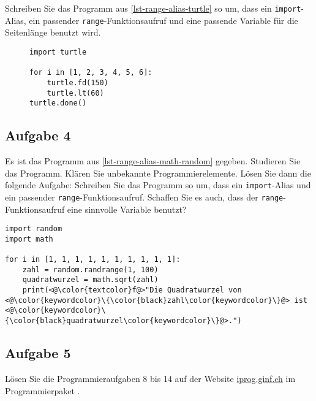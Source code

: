 Schreiben Sie das Programm aus \autoref{lst-range-alias-turtle} so um, dass ein \lstinline{import}-Alias, ein passender \lstinline{range}-Funktionsaufruf und eine passende Variable für die Seitenlänge benutzt wird.

\begin{figure}[htb]
\begin{minipage}{0.45\textwidth}
\fillwithgrid{2in}
\end{minipage}
\hfill
\begin{minipage}{0.5\textwidth}
\begin{lstlisting}[caption={Es wird ein regelmässiges \num{6}-Eck mit der Seitenlänge 150 gezeichnet.}, label={lst-range-alias-turtle}]
import turtle

for i in [1, 2, 3, 4, 5, 6]:
    turtle.fd(150)
    turtle.lt(60)
turtle.done()
\end{lstlisting}
\end{minipage}
\end{figure}

\subsection{Aufgabe 4}

Es ist das Programm aus \autoref{lst-range-alias-math-random} gegeben. Studieren Sie das Programm. Klären Sie unbekannte Programmierelemente. Lösen Sie dann die folgende Aufgabe: Schreiben Sie das Programm so um, dass ein \lstinline{import}-Alias und ein passender \lstinline{range}-Funktionsaufruf. Schaffen Sie es auch, dass der \lstinline{range}-Funktionsaufruf eine sinnvolle Variable benutzt?

\begin{lstlisting}[caption={Es werden Quadratwurzeln berechnet.}, label={lst-range-alias-math-random}]
import random
import math

for i in [1, 1, 1, 1, 1, 1, 1, 1, 1, 1]:
    zahl = random.randrange(1, 100)
    quadratwurzel = math.sqrt(zahl)
    print(<@\color{textcolor}f@>"Die Quadratwurzel von <@\color{keywordcolor}\{\color{black}zahl\color{keywordcolor}\}@> ist <@\color{keywordcolor}\{\color{black}quadratwurzel\color{keywordcolor}\}@>.")
\end{lstlisting}


\subsection{Aufgabe 5}

Lösen Sie die Programmieraufgaben 8 bis 14 auf der Website \url{iprog.ginf.ch} im Programmierpaket .